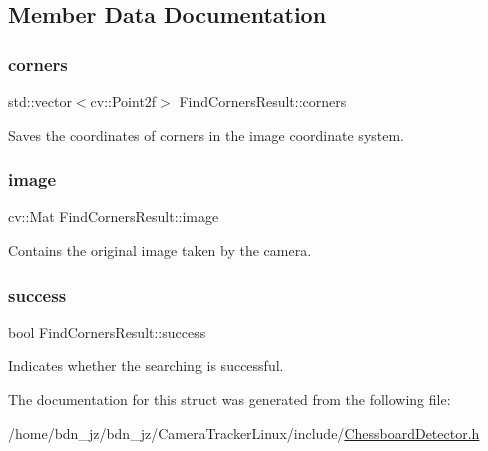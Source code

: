 \subsection{Member Data Documentation}
\mbox{\label{struct_find_corners_result_a138337b67fb9eb6010ec7c9a276a009f}} 
\subsubsection{\texorpdfstring{corners}{corners}}
{\footnotesize\ttfamily std\+::vector$<$cv\+::\+Point2f$>$ Find\+Corners\+Result\+::corners}

Saves the coordinates of corners in the image coordinate system. \mbox{\label{struct_find_corners_result_a8c2fd90c9f86bed108eb777fd237f113}} 
\subsubsection{\texorpdfstring{image}{image}}
{\footnotesize\ttfamily cv\+::\+Mat Find\+Corners\+Result\+::image}

Contains the original image taken by the camera. \mbox{\label{struct_find_corners_result_a53a6b5d4fc0243582800d92b2bc5e706}} 
\subsubsection{\texorpdfstring{success}{success}}
{\footnotesize\ttfamily bool Find\+Corners\+Result\+::success}

Indicates whether the searching is successful. 

The documentation for this struct was generated from the following file\+:\begin{DoxyCompactItemize}
\item 
/home/bdn\+\_\+jz/bdn\+\_\+jz/\+Camera\+Tracker\+Linux/include/\hyperlink{_chessboard_detector_8h}{Chessboard\+Detector.\+h}\end{DoxyCompactItemize}
